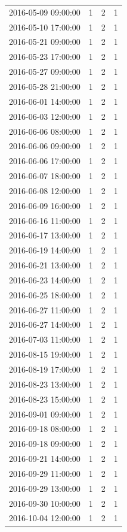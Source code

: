 \begin{tabular}{lrrr}
2016-05-09 09:00:00 & 1 & 2 & 1 \\
2016-05-10 17:00:00 & 1 & 2 & 1 \\
2016-05-21 09:00:00 & 1 & 2 & 1 \\
2016-05-23 17:00:00 & 1 & 2 & 1 \\
2016-05-27 09:00:00 & 1 & 2 & 1 \\
2016-05-28 21:00:00 & 1 & 2 & 1 \\
2016-06-01 14:00:00 & 1 & 2 & 1 \\
2016-06-03 12:00:00 & 1 & 2 & 1 \\
2016-06-06 08:00:00 & 1 & 2 & 1 \\
2016-06-06 09:00:00 & 1 & 2 & 1 \\
2016-06-06 17:00:00 & 1 & 2 & 1 \\
2016-06-07 18:00:00 & 1 & 2 & 1 \\
2016-06-08 12:00:00 & 1 & 2 & 1 \\
2016-06-09 16:00:00 & 1 & 2 & 1 \\
2016-06-16 11:00:00 & 1 & 2 & 1 \\
2016-06-17 13:00:00 & 1 & 2 & 1 \\
2016-06-19 14:00:00 & 1 & 2 & 1 \\
2016-06-21 13:00:00 & 1 & 2 & 1 \\
2016-06-23 14:00:00 & 1 & 2 & 1 \\
2016-06-25 18:00:00 & 1 & 2 & 1 \\
2016-06-27 11:00:00 & 1 & 2 & 1 \\
2016-06-27 14:00:00 & 1 & 2 & 1 \\
2016-07-03 11:00:00 & 1 & 2 & 1 \\
2016-08-15 19:00:00 & 1 & 2 & 1 \\
2016-08-19 17:00:00 & 1 & 2 & 1 \\
2016-08-23 13:00:00 & 1 & 2 & 1 \\
2016-08-23 15:00:00 & 1 & 2 & 1 \\
2016-09-01 09:00:00 & 1 & 2 & 1 \\
2016-09-18 08:00:00 & 1 & 2 & 1 \\
2016-09-18 09:00:00 & 1 & 2 & 1 \\
2016-09-21 14:00:00 & 1 & 2 & 1 \\
2016-09-29 11:00:00 & 1 & 2 & 1 \\
2016-09-29 13:00:00 & 1 & 2 & 1 \\
2016-09-30 10:00:00 & 1 & 2 & 1 \\
2016-10-04 12:00:00 & 1 & 2 & 1 \\

\end{tabular}
